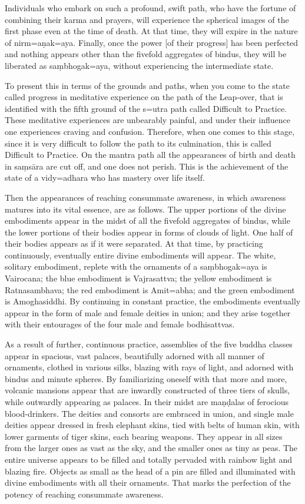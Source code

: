 \documentclass[11pt,twocolumn]{article}
\begin{document}
Individuals who embark on such a profound, swift path, who have the
fortune of combining their karma and prayers, will experience the
spherical images of the first phase even at the time of death. At that
time, they will expire in the nature of
nirm\a={a}\d{n}ak\a={a}ya. Finally, once the power [of their progress]
has been perfected and nothing appears other than the fivefold
aggregates of bindus, they will be liberated as sa\d{m}bhogak\a={a}ya,
without experiencing the intermediate state.

To present this in terms of the grounds and paths, when you come to
the state called progress in meditative experience on the path of the
Leap\hyp{}over, that is identified with the fifth ground of the
s\a={u}tra path called Difficult to Practice. These meditative
experiences are unbearably painful, and under their influence one
experiences craving and confusion. Therefore, when one comes to this
stage, since it is very difficult to follow the path to its
culmination, this is called Difficult to Practice. On the mantra path
all the appearances of birth and death in sa\d{m}s\={a}ra are cut off,
and one does not perish. This is the achievement of the state of a
vidy\a={a}dhara who has mastery over life itself.

Then the appearances of reaching consummate awareness, in which
awareness matures into its vital essence, are as follows.  The upper
portions of the divine embodiments appear in the midst of all the
fivefold aggregates of bindus, while the lower portions of their
bodies appear in forms of clouds of light. One half of their bodies
appears as if it were separated. At that time, by practicing
continuously, eventually entire divine embodiments will appear. The
white, solitary embodiment, replete with the ornaments of a
sa\d{m}bhogak\a={a}ya is Vairocana; the blue embodiment is
Vajrasattva; the yellow embodiment is Ratnasambhava; the red
embodiment is Amit\a={a}bha; and the green embodiment is
Amoghasiddhi. By continuing in constant practice, the embodiments
eventually appear in the form of male and female deities in union; and
they arise together with their entourages of the four male and female
bodhisattvas.

As a result of further, continuous practice, assemblies of the five
buddha classes appear in spacious, vast palaces, beautifully adorned
with all manner of ornaments, clothed in various silks, blazing with
rays of light, and adorned with bindus and minute spheres. By
familiarizing oneself with that more and more, volcanic mansions
appear that are inwardly constructed of three tiers of skulls, while
outwardly appearing as palaces. In their midst are ma\d{n}\d{d}alas of
ferocious blood\hyp{}drinkers. The deities and consorts are embraced
in union, and single male deities appear dressed in fresh elephant
skins, tied with belts of human skin, with lower garments of tiger
skins, each bearing weapons. They appear in all sizes from the larger
ones as vast as the sky, and the smaller ones as tiny as peas. The
entire universe appears to be filled and totally pervaded with rainbow
light and blazing fire. Objects as small as the head of a pin are
filled and illuminated with divine embodiments with all their
ornaments. That marks the perfection of the potency of reaching
consummate awareness.
\end{document}
